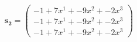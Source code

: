 \documentclass[preview]{standalone}
\begin{document}
\begin{align*}
\mathbf{s_2} = \begin{pmatrix}-1 + 7x^{1} + -9x^{2} + -2x^{3} \\ -1 + 7x^{1} + -9x^{2} + -2x^{3} \\ -1 + 7x^{1} + -9x^{2} + -2x^{3}\end{pmatrix}
\end{align*}
\end{document}
